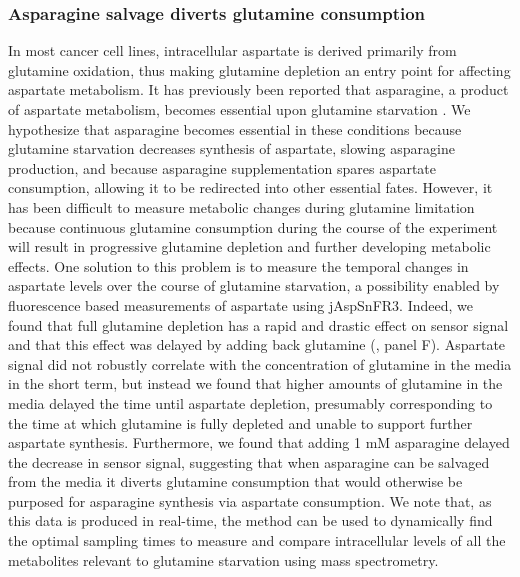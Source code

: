 \documentclass[9pt,lineno]{elife}
\begin{document}
\subsubsection{Asparagine salvage diverts glutamine consumption}
In most cancer cell lines, intracellular aspartate is derived primarily from glutamine oxidation, thus making glutamine depletion an entry point for affecting aspartate metabolism.
It has previously been reported that asparagine, a product of aspartate metabolism, becomes essential upon glutamine starvation \citep{Pavlova2018-nl, Zhang2014-zz}.
We hypothesize that asparagine becomes essential in these conditions because glutamine starvation decreases synthesis of aspartate, slowing asparagine production, and because asparagine supplementation spares aspartate consumption, allowing it to be redirected into other essential fates.
However, it has been difficult to measure metabolic changes during glutamine limitation because continuous glutamine consumption during the course of the experiment will result in progressive glutamine depletion and further developing metabolic effects.
One solution to this problem is to measure the temporal changes in aspartate levels over the course of glutamine starvation, a possibility enabled by fluorescence based measurements of aspartate using jAspSnFR3.
Indeed, we found that full glutamine depletion has a rapid and drastic effect on sensor signal and that this effect was delayed by adding back glutamine (, panel F).
Aspartate signal did not robustly correlate with the concentration of glutamine in the media in the short term, but instead we found that higher amounts of glutamine in the media delayed the time until aspartate depletion, presumably corresponding to the time at which glutamine is fully depleted and unable to support further aspartate synthesis.
Furthermore, we found that adding 1 mM asparagine delayed the decrease in sensor signal, suggesting that when asparagine can be salvaged from the media it diverts glutamine consumption that would otherwise be purposed for asparagine synthesis via aspartate consumption.
We note that, as this data is produced in real-time, the method can be used to dynamically find the optimal sampling times to measure and compare intracellular levels of all the metabolites relevant to glutamine starvation using mass spectrometry.
\end{document}
